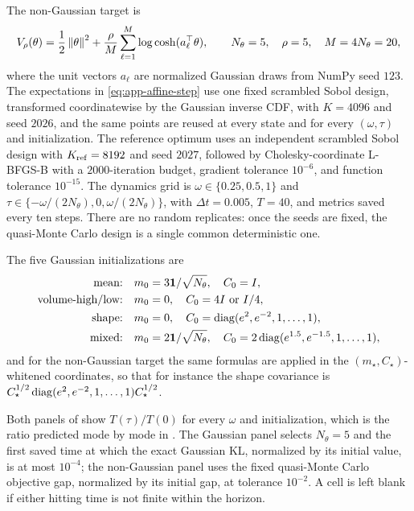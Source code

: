 The non-Gaussian target is
\begin{equation*}
  V_\rho(\theta) = \frac12\left\lVert \theta\right\rVert^2
  + \frac{\rho}{M}\sum_{\ell=1}^{M}\log\cosh(a_\ell^\top\theta),
  \qquad N_\theta = 5,\quad \rho = 5,\quad M = 4N_\theta = 20,
\end{equation*}
where the unit vectors $a_\ell$ are normalized Gaussian draws from NumPy seed
$123$. The expectations in \eqref{eq:app-affine-step} use one fixed scrambled
Sobol design, transformed coordinatewise by the Gaussian inverse CDF, with
$K = 4096$ and seed $2026$, and the same points are reused at every state and
for every $(\omega,\tau)$ and initialization. The reference optimum uses an
independent scrambled Sobol design with $K_{\rm ref} = 8192$ and seed $2027$,
followed by Cholesky-coordinate L-BFGS-B with a $2000$-iteration budget,
gradient tolerance $10^{-6}$, and function tolerance $10^{-15}$. The dynamics
grid is $\omega\in\{0.25,0.5,1\}$ and
$\tau\in\{-\omega/(2N_\theta),0,\omega/(2N_\theta)\}$, with $\Delta t = 0.005$,
$T = 40$, and metrics saved every ten steps. There are no random replicates:
once the seeds are fixed, the quasi-Monte Carlo design is a single common
deterministic one.

The five Gaussian initializations are
\begin{align*}
  \text{mean:}&\quad m_0 = 3\mathbf{1}/\sqrt{N_\theta},\quad C_0 = I,\\
  \text{volume-high/low:}&\quad m_0 = 0,\quad
    C_0 = 4I\ \text{or}\ I/4,\\
  \text{shape:}&\quad m_0 = 0,\quad
    C_0 = \operatorname{diag}(e^2,e^{-2},1,\ldots,1),\\
  \text{mixed:}&\quad m_0 = 2\mathbf{1}/\sqrt{N_\theta},\quad
    C_0 = 2\operatorname{diag}(e^{1.5},e^{-1.5},1,\ldots,1),
\end{align*}
and for the non-Gaussian target the same formulas are applied in the
$(m_\star,C_\star)$-whitened coordinates, so that for instance the shape
covariance is $C_\star^{1/2}\operatorname{diag}(e^2,e^{-2},1,\ldots,1)C_\star^{1/2}$.

Both panels of  show $T(\tau)/T(0)$ for every $\omega$ and
initialization, which is the ratio predicted mode by mode in
. The Gaussian panel selects $N_\theta = 5$ and the first
saved time at which the exact Gaussian KL, normalized by its initial value, is
at most $10^{-4}$; the non-Gaussian panel uses the fixed quasi-Monte Carlo
objective gap, normalized by its initial gap, at tolerance $10^{-2}$. A cell is
left blank if either hitting time is not finite within the horizon.

